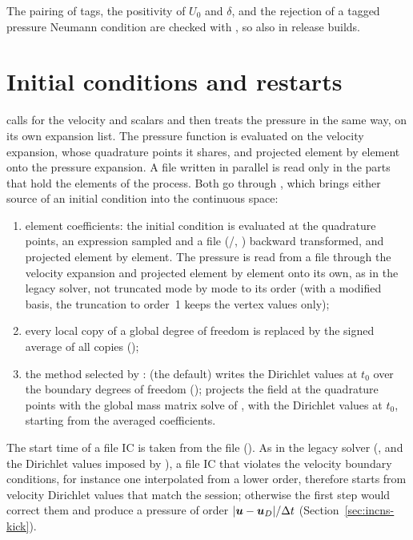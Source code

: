 The pairing of tags, the positivity of $U_0$ and $\delta$, and the
rejection of a tagged pressure Neumann condition are checked with
, so also in release builds.

\section{Initial conditions and restarts}
\label{sec:incns-ic}

 calls
 for the velocity and scalars
and then treats the pressure in the same way, on its own expansion list. The
pressure function is evaluated on the velocity expansion, whose quadrature
points it shares, and projected element by element onto the pressure
expansion. A file written in parallel is read only in the parts that hold
the elements of the process.
Both go through , which
brings either source of an initial condition into the continuous space:
\begin{enumerate}
  \item element coefficients: the initial condition is evaluated at the
  quadrature points, an expression sampled and a file (/,
  ) backward transformed, and projected
  element by element. The pressure is read from a file through the velocity
  expansion and projected element by element onto its own, as in the legacy
  solver, not truncated mode by mode to its order (with a modified basis,
  the truncation to order~1 keeps the vertex values only);
  \item every local copy of a global degree of freedom is replaced by the
  signed average of all copies ();
  \item the method selected by :
   (the default) writes the Dirichlet values at $t_0$ over the
  boundary degrees of freedom (); 
  projects the field at the quadrature points with the global mass matrix
  solve of , with the Dirichlet values at $t_0$, starting
  from the averaged coefficients.
\end{enumerate}
The start time of a file IC is taken from the file
(). As in the legacy solver
(,  and the Dirichlet values imposed
by ), a file IC that
violates the velocity boundary conditions, for instance one interpolated
from a lower order, therefore starts from velocity Dirichlet values that
match the session; otherwise the first step would correct them and produce
a pressure of order $|\boldsymbol{u}-\boldsymbol{u}_D|/\Delta t$
(Section~\ref{sec:incns-kick}).

